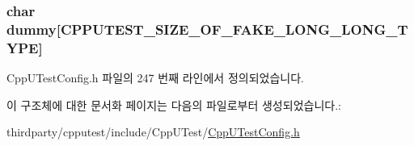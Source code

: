 \subsubsection[{\texorpdfstring{dummy}{dummy}}]{\setlength{\rightskip}{0pt plus 5cm}char dummy\mbox{[}{\bf C\+P\+P\+U\+T\+E\+S\+T\+\_\+\+S\+I\+Z\+E\+\_\+\+O\+F\+\_\+\+F\+A\+K\+E\+\_\+\+L\+O\+N\+G\+\_\+\+L\+O\+N\+G\+\_\+\+T\+Y\+PE}\mbox{]}}\hypertarget{structcpputest__longlong_a3aa94a3fffaef9e393bfe23c93aa6688}{}\label{structcpputest__longlong_a3aa94a3fffaef9e393bfe23c93aa6688}


Cpp\+U\+Test\+Config.\+h 파일의 247 번째 라인에서 정의되었습니다.



이 구조체에 대한 문서화 페이지는 다음의 파일로부터 생성되었습니다.\+:\begin{DoxyCompactItemize}
\item 
thirdparty/cpputest/include/\+Cpp\+U\+Test/\hyperlink{_cpp_u_test_config_8h}{Cpp\+U\+Test\+Config.\+h}\end{DoxyCompactItemize}
